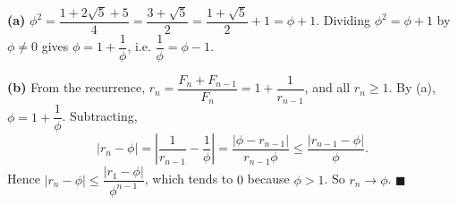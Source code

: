 \textbf{(a)} $\phi^2=\dfrac{1+2\sqrt5+5}{4}=\dfrac{3+\sqrt5}{2}=\dfrac{1+\sqrt5}{2}+1=\phi+1$. Dividing $\phi^2=\phi+1$ by $\phi\ne0$ gives $\phi=1+\dfrac1\phi$, i.e. $\dfrac1\phi=\phi-1$.

\textbf{(b)} From the recurrence, $r_n=\dfrac{F_n+F_{n-1}}{F_n}=1+\dfrac{1}{r_{n-1}}$, and all $r_n\ge1$. By (a), $\phi=1+\dfrac1\phi$. Subtracting,
\[\left|r_n-\phi\right|=\left|\dfrac1{r_{n-1}}-\dfrac1\phi\right|=\dfrac{\left|\phi-r_{n-1}\right|}{r_{n-1}\phi}\le\dfrac{\left|r_{n-1}-\phi\right|}{\phi}.\]
Hence $\left|r_n-\phi\right|\le\dfrac{\left|r_1-\phi\right|}{\phi^{n-1}}$, which tends to $0$ because $\phi>1$. So $r_n\to\phi$. $\blacksquare$
